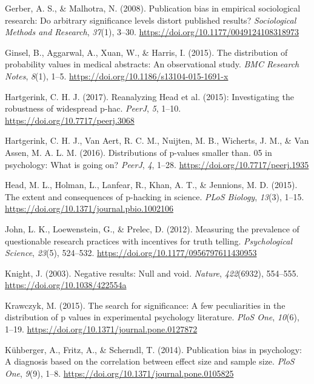 \documentclass[
  12pt,
]{article}
\begin{document}
\leavevmode\hypertarget{ref-Gerber2008}{}%
Gerber, A. S., \& Malhotra, N. (2008). Publication bias in empirical
sociological research: Do arbitrary significance levels distort
published results? \emph{Sociological Methods and Research},
\emph{37}(1), 3--30. \url{https://doi.org/10.1177/0049124108318973}

\leavevmode\hypertarget{ref-Ginsel}{}%
Ginsel, B., Aggarwal, A., Xuan, W., \& Harris, I. (2015). The
distribution of probability values in medical abstracts: An
observational study. \emph{BMC Research Notes}, \emph{8}(1), 1--5.
\url{https://doi.org/10.1186/s13104-015-1691-x}

\leavevmode\hypertarget{ref-Hartgerink2017}{}%
Hartgerink, C. H. J. (2017). Reanalyzing Head et al. (2015):
Investigating the robustness of widespread p-hac. \emph{PeerJ},
\emph{5}, 1--10. \url{https://doi.org/10.7717/peerj.3068}

\leavevmode\hypertarget{ref-Hartgerink2016}{}%
Hartgerink, C. H. J., Van Aert, R. C. M., Nuijten, M. B., Wicherts, J.
M., \& Van Assen, M. A. L. M. (2016). Distributions of p-values smaller
than. 05 in psychology: What is going on? \emph{PeerJ}, \emph{4}, 1--28.
\url{https://doi.org/10.7717/peerj.1935}

\leavevmode\hypertarget{ref-Head2015}{}%
Head, M. L., Holman, L., Lanfear, R., Khan, A. T., \& Jennions, M. D.
(2015). The extent and consequences of p-hacking in science. \emph{PLoS
Biology}, \emph{13}(3), 1--15.
\url{https://doi.org/10.1371/journal.pbio.1002106}

\leavevmode\hypertarget{ref-John}{}%
John, L. K., Loewenstein, G., \& Prelec, D. (2012). Measuring the
prevalence of questionable research practices with incentives for truth
telling. \emph{Psychological Science}, \emph{23}(5), 524--532.
\url{https://doi.org/10.1177/0956797611430953}

\leavevmode\hypertarget{ref-Knight}{}%
Knight, J. (2003). Negative results: Null and void. \emph{Nature},
\emph{422}(6932), 554--555. \url{https://doi.org/10.1038/422554a}

\leavevmode\hypertarget{ref-Krawczyk}{}%
Krawczyk, M. (2015). The search for significance: A few peculiarities in
the distribution of p values in experimental psychology literature.
\emph{PloS One}, \emph{10}(6), 1--19.
\url{https://doi.org/10.1371/journal.pone.0127872}

\leavevmode\hypertarget{ref-Kuhberger}{}%
Kühberger, A., Fritz, A., \& Scherndl, T. (2014). Publication bias in
psychology: A diagnosis based on the correlation between effect size and
sample size. \emph{PloS One}, \emph{9}(9), 1--8.
\url{https://doi.org/10.1371/journal.pone.0105825}
\end{document}
